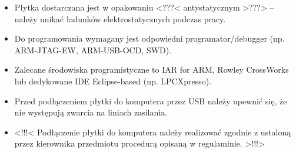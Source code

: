 \documentclass[letterpaper,11pt]{report}
\begin{document}
\begin{itemize}
    \item Płytka dostarczana jest w opakowaniu <???< antystatycznym >???> -- należy unikać ładunków elektrostatycznych podczas pracy.
    \item Do programowania wymagany jest odpowiedni programator/debugger (np. ARM-JTAG-EW, ARM-USB-OCD, SWD).
    \item Zalecane środowiska programistyczne to IAR for ARM, Rowley CrossWorks lub dedykowane IDE Eclipse-based (np. LPCXpresso).
    \item Przed podłączeniem płytki do komputera przez USB należy upewnić się, że nie występują zwarcia na liniach zasilania.
    \item <!!!< Podłączenie płytki do komputera należy realizować zgodnie z ustaloną przez kierownika przedmiotu procedurą opisaną w regulaminie. >!!!>
\end{itemize}
\end{document}
